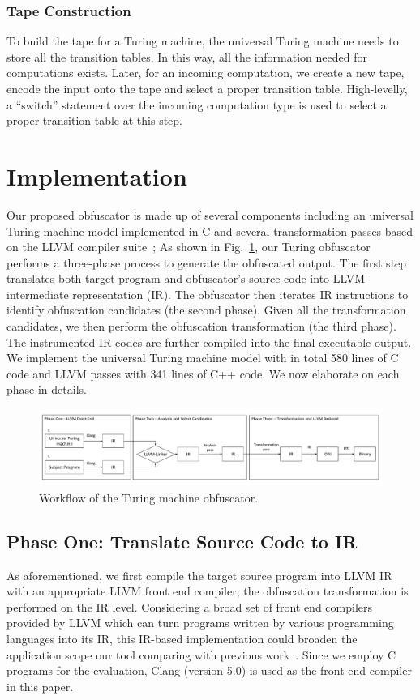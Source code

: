 \documentclass[lnicst]{svmultln}
\newcommand{\F}{Fig.}
\begin{document}
\subsubsection{Tape Construction}
To build the tape for a Turing machine, the universal Turing machine needs to
store all the transition tables. In this way, all the information needed for
computations exists. Later, for an incoming computation, we create a new tape,
encode the input onto the tape and select a proper transition table.
High-levelly, a ``switch'' statement over the incoming computation type is used
to select a proper transition table at this step.

\section{Implementation}
Our proposed obfuscator is made up of several components including an universal
Turing machine model implemented in C and several transformation passes based on
the LLVM compiler suite~\cite{LLVM}; As shown in \F~\ref{fig:five}, our Turing
obfuscator performs a three-phase process to generate the obfuscated output. The
first step translates both target program and obfuscator's source code into LLVM
intermediate representation (IR). The obfuscator then iterates IR instructions
to identify obfuscation candidates (the second phase). Given all the
transformation candidates, we then perform the obfuscation transformation (the
third phase). The instrumented IR codes are further compiled into the final
executable output. We implement the universal Turing machine model with in total
580 lines of C code and LLVM passes with 341 lines of C++ code. We now
elaborate on each phase in details.

\begin{figure}
 \includegraphics[width=\linewidth]{overview.pdf}
 \caption{Workflow of the Turing machine obfuscator.}
 \label{fig:five}
\end{figure}

\subsection{Phase One: Translate Source Code to IR}
\label{subsec:phase-one}
As aforementioned, we first compile the target source program into LLVM IR with
an appropriate LLVM front end compiler; the obfuscation transformation is
performed on the IR level. Considering a broad set of front end compilers
provided by LLVM which can turn programs written by various programming
languages into its IR, this IR-based implementation could broaden the
application scope our tool comparing with previous work~\cite{Ma, Zhi, Maieee}.
Since we employ C programs for the evaluation, Clang (version 5.0) is used as
the front end compiler in this paper.
\end{document}
